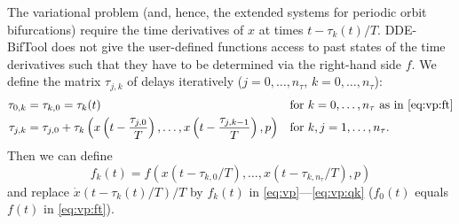 \documentclass[11pt]{scrartcl}
\begin{document}
The variational problem (and, hence, the extended systems for periodic
orbit bifurcations) require the time derivatives of $x$ at times
$t-\tau_k(t)/T$. DDE-BifTool does not give the user-defined functions
access to past states of the time derivatives such that they have to
be determined via the right-hand side $f$.  We define the matrix
$\tau_{j,k}$ of delays iteratively ($j=0,\ldots,n_\tau$,
$k=0,\ldots,n_\tau$):
\begin{align}
  \label{eq:tau0jdef}
  \tau_{0,k}&=\tau_{k,0}=\tau_k(t)&&\mbox{for $k=0,\ldots,n_\tau$ as
     in
    \eqref{eq:vp:ft}}\\
  \tau_{j,k}&=\tau_{j,0}+\tau_k\left(x\left(t-\frac{\tau_{j,0}}{T}\right),
      \ldots,x\left(t-\frac{\tau_{j,k-1}}{T}\right),p\right)&&\mbox{for
        $k,j=1,\ldots,n_\tau$.}
\end{align}
Then we can define
\begin{equation}
  \label{eq:ftkdef}
  f_k(t)=f(x(t-\tau_{k,0}/T),\ldots,x(t-\tau_{k,n_\tau}/T),p)
\end{equation}
and replace $\dot x(t-\tau_k(t)/T)/T$ by $f_k(t)$ in
\eqref{eq:vp}---\eqref{eq:vp:qk} ($f_0(t)$ equals $f(t)$ in \eqref{eq:vp:ft}).
\end{document}
